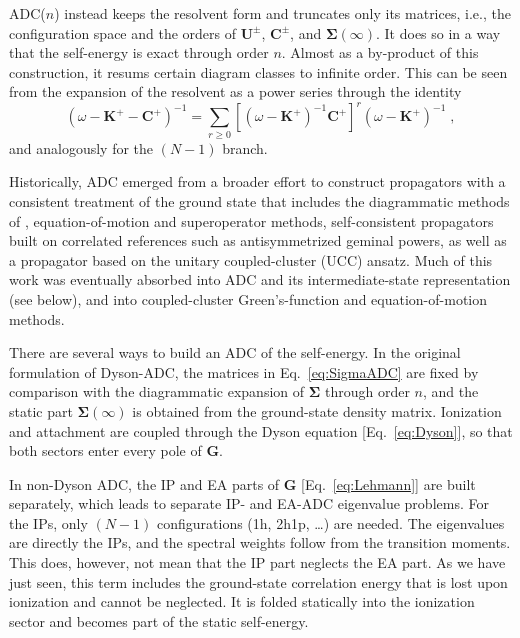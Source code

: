 \documentclass[aip,jcp,reprint,noshowkeys,superscriptaddress]{revtex4-2}
\newcommand{\bG}{\boldsymbol{G}}
\begin{document}
ADC($n$) instead keeps the resolvent form and truncates only its matrices, i.e., the configuration space and the orders of $\mathbf{U}^{\pm}$, $\mathbf{C}^{\pm}$, and $\pmb{\Sigma}(\infty)$. It does so in a way that the self-energy is exact through order $n$.
Almost as a by-product of this construction, it resums certain diagram classes to infinite order. This can be seen from the expansion of the resolvent as a power series through the identity
\begin{equation}
\left(\omega - \mathbf{K}^{+} - \mathbf{C}^{+}\right)^{-1} = 
\sum_{r \geq 0} \left[\left(\omega - \mathbf{K}^{+} \right)^{-1}\mathbf{C}^{+} \right]^r
\left(\omega - \mathbf{K}^{+} \right)^{-1} \;,
\end{equation}
and analogously for the $(N-1)$ branch. 

Historically, ADC emerged from a broader effort to construct propagators with a consistent treatment of the ground state that includes the diagrammatic methods of \citet{Cederbaum_1977a}, equation-of-motion and superoperator methods,\cite{Rowe_1968a,Simons_1973,Linderberg_2004} self-consistent propagators built on correlated references such as antisymmetrized geminal powers,\cite{Born_1980,Weiner_1980,Weiner_1983} as well as a propagator based on the unitary coupled-cluster (UCC) ansatz.\cite{prasad1985some,Kutzelnigg_1982,mukherjee1989effective} Much of this work was eventually absorbed into ADC and its intermediate-state representation (see below),\cite{Schirmer_1982,Schirmer_1983,Schirmer_1991} and into coupled-cluster Green's-function\cite{Nooijen_1992,Nooijen_1993} and equation-of-motion methods.\cite{Stanton_1993a,Krylov_2008}

There are several ways to build an ADC of the self-energy. In the original formulation of Dyson-ADC,\cite{Schirmer_1983} the matrices in Eq.~\eqref{eq:SigmaADC} are fixed by comparison with the diagrammatic expansion of $\pmb{\Sigma}$ through order $n$, and the static part $\pmb{\Sigma}(\infty)$ is obtained from the ground-state density matrix.\cite{Schirmer_1983}
Ionization and attachment are coupled through the Dyson equation [Eq.~\eqref{eq:Dyson}], so that both sectors enter every pole of $\bG$.

In non-Dyson ADC,\cite{Schirmer_1998,Trofimov_2005} the IP and EA parts of $\bG$ [Eq.~\eqref{eq:Lehmann}] are built separately, which leads to separate IP- and EA-ADC eigenvalue problems.
For the IPs, only $(N-1)$ configurations (1h, 2h1p, \dots) are needed. The eigenvalues are directly the IPs, and the spectral weights follow from the transition moments.
This does, however, not mean that the IP part neglects the EA part.
As we have just seen, this term includes the ground-state correlation energy that is lost upon ionization
and cannot be neglected. It is folded statically into the ionization sector and becomes part of the static self-energy.
\end{document}
